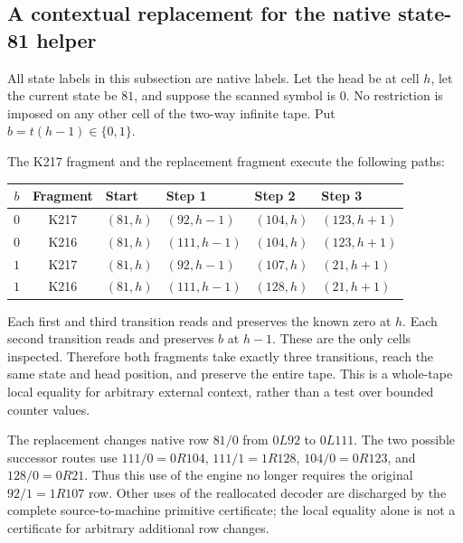 \subsection{A contextual replacement for the native state-81 helper}
All state labels in this subsection are native labels.  Let the head be at
cell $h$, let the current state be $81$, and suppose the scanned symbol is
$0$.  No restriction is imposed on any other cell of the two-way infinite
tape.  Put $b=t(h-1)\in\{0,1\}$.

The K217 fragment and the replacement fragment execute the following paths:
\begin{center}
\begin{tabular}{ccllll}
\toprule
$b$ & Fragment & Start & Step 1 & Step 2 & Step 3 \\
\midrule
$0$ & K217 & $(81,h)$ & $(92,h-1)$ & $(104,h)$ & $(123,h+1)$ \\
$0$ & K216 & $(81,h)$ & $(111,h-1)$ & $(104,h)$ & $(123,h+1)$ \\
$1$ & K217 & $(81,h)$ & $(92,h-1)$ & $(107,h)$ & $(21,h+1)$ \\
$1$ & K216 & $(81,h)$ & $(111,h-1)$ & $(128,h)$ & $(21,h+1)$ \\
\bottomrule
\end{tabular}
\end{center}
Each first and third transition reads and preserves the known zero at $h$.
Each second transition reads and preserves $b$ at $h-1$.  These are the only
cells inspected.  Therefore both fragments take exactly three transitions,
reach the same state and head position, and preserve the entire tape.  This
is a whole-tape local equality for arbitrary external context, rather than
a test over bounded counter values.

The replacement changes native row $81/0$ from $0L92$ to $0L111$.  The two
possible successor routes use $111/0=0R104$, $111/1=1R128$,
$104/0=0R123$, and $128/0=0R21$.  Thus this use of the engine no longer
requires the original $92/1=1R107$ row.  Other uses of the reallocated decoder
are discharged by the complete source-to-machine primitive certificate;
the local equality alone is not a certificate for arbitrary additional
row changes.
